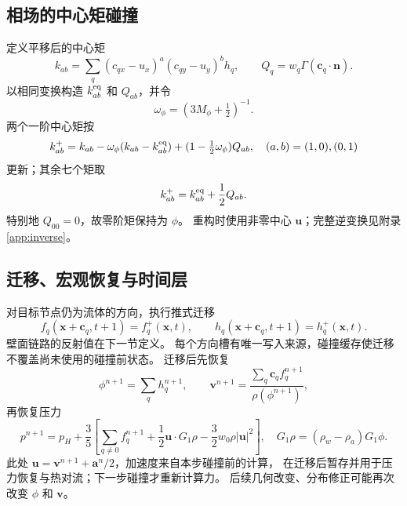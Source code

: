 
\subsection{相场的中心矩碰撞}
定义平移后的中心矩
\begin{equation}
 k_{ab}=\sum_q(c_{qx}-u_x)^a(c_{qy}-u_y)^b h_q,
 \qquad Q_q=w_q\Gamma(\bm c_q\cdot\bm n).
\end{equation}
以相同变换构造 $k^{\rm eq}_{ab}$ 和 $Q_{ab}$，并令
\begin{equation}
 \omega_\phi=(3M_\phi+\tfrac12)^{-1}.
\end{equation}
两个一阶中心矩按
\begin{equation}
 k_{ab}^+=k_{ab}-\omega_\phi(k_{ab}-k_{ab}^{\rm eq})
 +(1-\tfrac12\omega_\phi)Q_{ab},\quad (a,b)=(1,0),(0,1)
\end{equation}
更新；其余七个矩取
\begin{equation}
 k_{ab}^+=k_{ab}^{\rm eq}+\frac12Q_{ab}.
\end{equation}
特别地 $Q_{00}=0$，故零阶矩保持为 $\phi$。
重构时使用非零中心 $\bm u$；完整逆变换见附录 \ref{app:inverse}。


\subsection{迁移、宏观恢复与时间层}
对目标节点仍为流体的方向，执行推式迁移
\begin{equation}
 f_q(\bm x+\bm c_q,t+1)=f_q^+(\bm x,t),\qquad
 h_q(\bm x+\bm c_q,t+1)=h_q^+(\bm x,t).
\end{equation}
壁面链路的反射值在下一节定义。
每个方向槽有唯一写入来源，碰撞缓存使迁移不覆盖尚未使用的碰撞前状态。
迁移后先恢复
\begin{equation}
 \phi^{n+1}=\sum_qh_q^{n+1},\qquad
 \bm v^{n+1}=\frac{\sum_q\bm c_qf_q^{n+1}}{\rho(\phi^{n+1})},
\end{equation}
再恢复压力
\begin{equation}
 p^{n+1}=p_H+\frac35\left[
 \sum_{q\ne0}f_q^{n+1}+\frac12\bm u\cdot G_1\rho
 -\frac32w_0\rho|\bm u|^2\right],
 \quad G_1\rho=(\rho_w-\rho_a)G_1\phi.
 \label{eq:pressure}
\end{equation}
此处 $\bm u=\bm v^{n+1}+\bm a^n/2$，加速度来自本步碰撞前的计算，
在迁移后暂存并用于压力恢复与热对流；下一步碰撞才重新计算力。
后续几何改变、分布修正可能再次改变 $\phi$ 和 $\bm v$。

